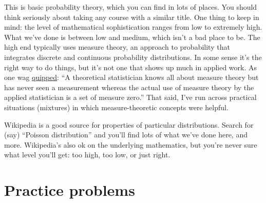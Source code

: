 \documentclass[11pt]{article}
\begin{document}
This is basic probability theory, which you can find in lots of places.
You should think seriously about taking any course with a similar title.
One thing to keep in mind:
the level of mathematical sophistication ranges from low to extremely high.
What we've done is between low and medium, which isn't a bad place to be.
The high end typically uses measure theory, an approach to probability
that integrates  discrete and continuous probability distributions.
In some sense it's the right way to do things,
but it's not one that shows up much in applied work.
As one wag
\href{http://andrewgelman.com/2009/05/27/the_benefits_of/}{quipped}:
``A theoretical statistician knows all about measure theory
but has never seen a measurement whereas the actual use of measure theory by the applied statistician is a set of measure zero.''
That said, I've run across practical situations (mixtures) in which measure-theoretic concepts
were helpful.

Wikipedia is a good source for properties of particular distributions.
Search for (say) ``Poisson distribution'' and you'll find lots of what we've done here,
and more.
Wikipedia's also ok on the underlying mathematics, but you're never sure what
level you'll get:  too high, too low, or just right.


\section*{Practice problems}
\end{document}
